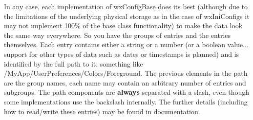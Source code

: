In any case, each implementation of wxConfigBase does its best (although due
to the limitations of the underlying physical storage as in the case of
wxIniConfigs it may not implement 100\% of the base class functionality) to
make the data look the same way everywhere. So you have the groups of entries
and the entries themselves. Each entry contains either a string or a number
(or a boolean value... support for other types of data such as dates or
timestamps is planned) and is identified by the full path to it: something
like /MyApp/UserPreferences/Colors/Foreground. The previous elements in the
path are the group names, each name may contain an arbitrary number of entries
and subgroups. The path components are {\bf always} separated with a slash,
even though some implementations use the backslash internally. The further
details (including how to read/write these entries) may be found in
 documentation.
